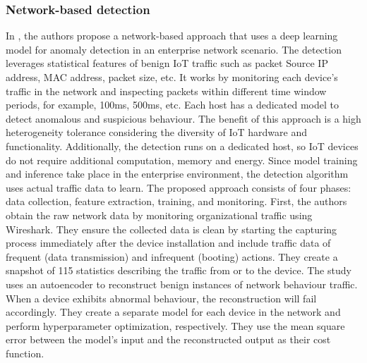 \documentclass[conference, 11pt]{IEEEtran}
\begin{document}
    \subsubsection{Network-based detection}
    In \cite{article:4}, the authors propose a network-based approach that uses a deep learning model for anomaly detection in an enterprise network scenario.
    The detection leverages statistical features of benign IoT traffic such as packet Source IP address, MAC address, packet size, etc.
    It works by monitoring each device's traffic in the network and inspecting packets within different time window periods, for example, 100ms, 500ms, etc.
    Each host has a dedicated model to detect anomalous and suspicious behaviour.
    The benefit of this approach is a high heterogeneity tolerance considering the diversity of IoT hardware and functionality.
    Additionally, the detection runs on a dedicated host, so IoT devices do not require additional computation, memory and energy.
    Since model training and inference take place in the enterprise environment, the detection algorithm uses actual traffic data to learn.
    The proposed approach consists of four phases: data collection, feature extraction, training, and monitoring.
    First, the authors obtain the raw network data by monitoring organizational traffic using Wireshark.
    They ensure the collected data is clean by starting the capturing process immediately after the device installation and include traffic data of frequent (data transmission) and infrequent (booting) actions.
    They create a snapshot of 115 statistics describing the traffic from or to the device.
    The study uses an autoencoder to reconstruct benign instances of network behaviour traffic.
    When a device exhibits abnormal behaviour, the reconstruction will fail accordingly.
    They create a separate model for each device in the network and perform hyperparameter optimization, respectively.
    They use the mean square error between the model's input and the reconstructed output as their cost function.
\end{document}
